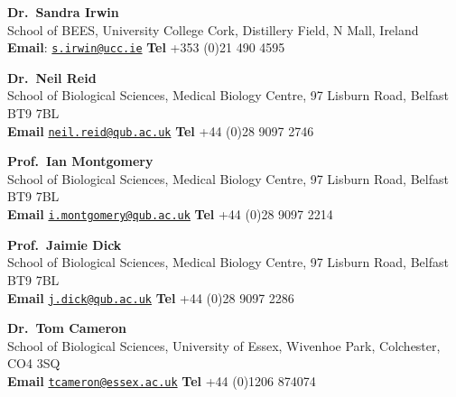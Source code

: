 \documentclass[]{article}
\begin{document}
\textbf{Dr.~Sandra Irwin}\\
School of BEES, University College Cork, Distillery Field, N Mall,
Ireland\\
\textbf{Email}: \href{mailto:s.irwin@ucc.ie}{\nolinkurl{s.irwin@ucc.ie}}
\textbf{Tel} +353 (0)21 490 4595

\textbf{Dr.~Neil Reid}\\
School of Biological Sciences, Medical Biology Centre, 97 Lisburn Road,
Belfast BT9 7BL\\
\textbf{Email}
\href{mailto:neil.reid@qub.ac.uk}{\nolinkurl{neil.reid@qub.ac.uk}}
\textbf{Tel} +44 (0)28 9097 2746

\textbf{Prof.~Ian Montgomery}\\
School of Biological Sciences, Medical Biology Centre, 97 Lisburn Road,
Belfast BT9 7BL\\
\textbf{Email}
\href{mailto:i.montgomery@qub.ac.uk}{\nolinkurl{i.montgomery@qub.ac.uk}}
\textbf{Tel} +44 (0)28 9097 2214

\textbf{Prof.~Jaimie Dick}\\
School of Biological Sciences, Medical Biology Centre, 97 Lisburn Road,
Belfast BT9 7BL\\
\textbf{Email}
\href{mailto:j.dick@qub.ac.uk}{\nolinkurl{j.dick@qub.ac.uk}}
\textbf{Tel} +44 (0)28 9097 2286

\textbf{Dr.~Tom Cameron}\\
School of Biological Sciences, University of Essex, Wivenhoe Park,
Colchester, CO4 3SQ\\
\textbf{Email}
\href{mailto:tcameron@essex.ac.uk}{\nolinkurl{tcameron@essex.ac.uk}}
\textbf{Tel} +44 (0)1206 874074
\end{document}
